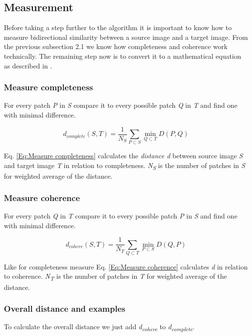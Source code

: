 \subsection{Measurement}
Before taking a step further to the algorithm it is important to know how to measure bidirectional similarity between a source image and a target image. From the previous subsection 2.1 we know how completeness and coherence work technically. The remaining step now is to convert it to a mathematical equation as described in \cite{bisi}.

\subsubsection*{Measure completeness}
For every patch \textit{P} in \textit{S} compare it to every possible patch \textit{Q} in \textit{T} and find one with minimal difference.

\large
\begin{equation}
\label{Eq:Measure completeness}
d_{complete}(S,T)=\frac{1}{N_{S}}\sum_{P \subset S} \min\limits_{Q \subset T} D(P,Q)
\end{equation}
\normalsize

Eq. \ref{Eq:Measure completeness} calculates the \textit{distance d} between source image \textit{S} and target image \textit{T} in relation to completeness. \textit{N\textsubscript{S}} is the number of patches in \textit{S} for weighted average of the distance.

\subsubsection*{Measure coherence}
For every patch \textit{Q} in \textit{T} compare it to every possible patch \textit{P} in \textit{S} and find one with minimal difference.

\large
\begin{equation}
\label{Eq:Measure coherence}
d_{cohere}(S,T)=\frac{1}{N_{T}}\sum_{Q \subset T} \min\limits_{P \subset S} D(Q,P)
\end{equation}
\normalsize

Like for completeness measure Eq. \ref{Eq:Measure coherence} calculates \textit{d} in relation to coherence. \textit{N\textsubscript{T}} is the number of patches in \textit{T} for weighted average of the distance.

\subsubsection*{Overall distance and examples}
To calculate the overall distance we just add \textit{d\textsubscript{cohere}} to \textit{d\textsubscript{complete}}.

